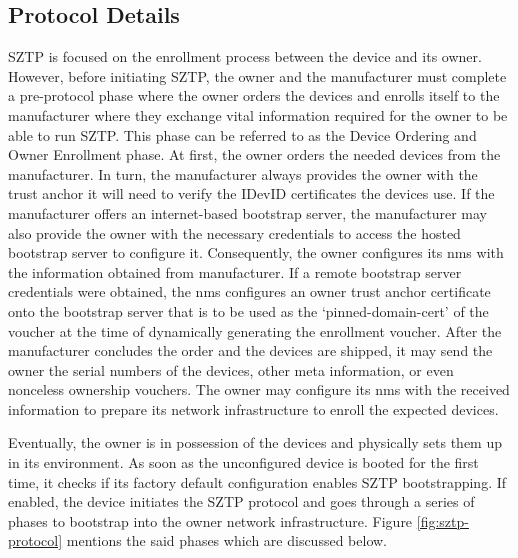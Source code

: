 \subsection{Protocol Details}
SZTP is focused on the enrollment process between the device and its owner.
However, before initiating SZTP, the owner and the manufacturer must complete a pre-protocol phase where the owner orders the devices and enrolls itself to the manufacturer where they exchange vital information required for the owner to be able to run SZTP.
This phase can be referred to as the Device Ordering and Owner Enrollment phase.
At first, the owner orders the needed devices from the manufacturer. In turn, the manufacturer always provides the owner with the trust anchor it will need to verify the IDevID certificates the devices use.
If the manufacturer offers an internet-based bootstrap server, the manufacturer may also provide the owner with the necessary credentials to access the hosted bootstrap server to configure it.
Consequently, the owner configures its \gls{nms} with the information obtained from manufacturer. If a remote bootstrap server credentials were obtained, the \gls{nms} configures an owner trust anchor certificate onto the bootstrap server that is to be used as the `pinned-domain-cert' of the voucher at the time of dynamically generating the enrollment voucher. 
After the manufacturer concludes the order and the devices are shipped, it may send the owner the serial numbers of the devices, other meta information, or even nonceless ownership vouchers. The owner may configure its \gls{nms} with the received information to prepare its network infrastructure to enroll the expected devices.
\par
Eventually, the owner is in possession of the devices and physically sets them up in its environment. As soon as the unconfigured device is booted for the first time, it checks if its factory default configuration enables SZTP bootstrapping. If enabled, the device initiates the SZTP protocol and goes through a series of phases to bootstrap into the owner network infrastructure. Figure \ref{fig:sztp-protocol} mentions the said phases which are discussed below.

